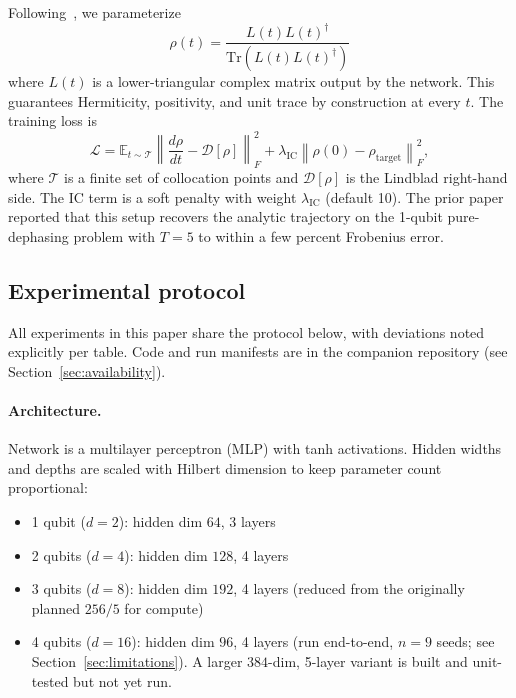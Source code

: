 \documentclass[11pt]{article}
\begin{document}
Following~\cite{hangen2024constraint}, we parameterize
\begin{equation}
\rho(t) = \frac{L(t) L(t)^\dagger}{\mathrm{Tr}(L(t) L(t)^\dagger)}
\label{eq:cholesky}
\end{equation}
where $L(t)$ is a lower-triangular complex matrix output by the network. This guarantees Hermiticity, positivity, and unit trace by construction at every $t$. The training loss is
\begin{equation}
\mathcal{L} = \mathbb{E}_{t \sim \mathcal{T}}\left\| \frac{d\rho}{dt} - \mathcal{D}[\rho] \right\|_F^2 + \lambda_{\mathrm{IC}} \left\| \rho(0) - \rho_{\mathrm{target}} \right\|_F^2,
\label{eq:cholesky-loss}
\end{equation}
where $\mathcal{T}$ is a finite set of collocation points and $\mathcal{D}[\rho]$ is the Lindblad right-hand side. The IC term is a soft penalty with weight $\lambda_{\mathrm{IC}}$ (default 10). The prior paper reported that this setup recovers the analytic trajectory on the 1-qubit pure-dephasing problem with $T = 5$ to within a few percent Frobenius error.

\subsection{Experimental protocol}
\label{sec:protocol}

All experiments in this paper share the protocol below, with deviations noted explicitly per table. Code and run manifests are in the companion repository (see Section~\ref{sec:availability}).

\paragraph{Architecture.}
Network is a multilayer perceptron (MLP) with tanh activations. Hidden widths and depths are scaled with Hilbert dimension to keep parameter count proportional:
\begin{itemize}
\item 1 qubit ($d=2$): hidden dim $64$, 3 layers
\item 2 qubits ($d=4$): hidden dim $128$, 4 layers
\item 3 qubits ($d=8$): hidden dim $192$, 4 layers (reduced from the originally planned $256/5$ for compute)
\item 4 qubits ($d=16$): hidden dim $96$, 4 layers (run end-to-end, $n = 9$ seeds; see Section~\ref{sec:limitations}). A larger $384$-dim, 5-layer variant is built and unit-tested but not yet run.
\end{itemize}
\end{document}
